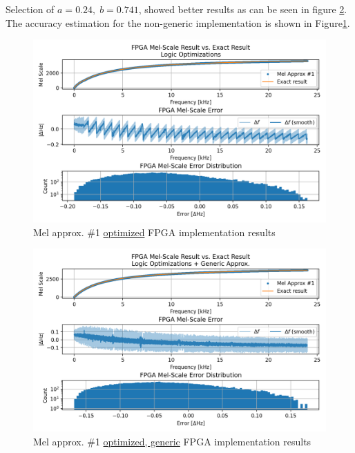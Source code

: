 Selection of \(a=0.24,\;b=0.741\), showed better results
as can be seen in figure \ref{fig:mel_approx_logic_opt_generic}.
The accuracy estimation for the non-generic implementation
is shown in Figure\;\ref{fig:mel_approx_logic_opt}.

\begin{figure}[H]
    \centering
    \includegraphics[width=\linewidth]{Scaling/images/mel_approx_logic_opt}
    \caption{Mel approx. \#1 \underline{optimized} FPGA implementation results}\label{fig:mel_approx_logic_opt}
\end{figure}


\begin{figure}[H]
    \centering
    \includegraphics[width=\linewidth]{Scaling/images/mel_approx_logic_opt_generic}
    \caption{Mel approx. \#1 \underline{optimized, generic} FPGA implementation results}\label{fig:mel_approx_logic_opt_generic}
\end{figure}


